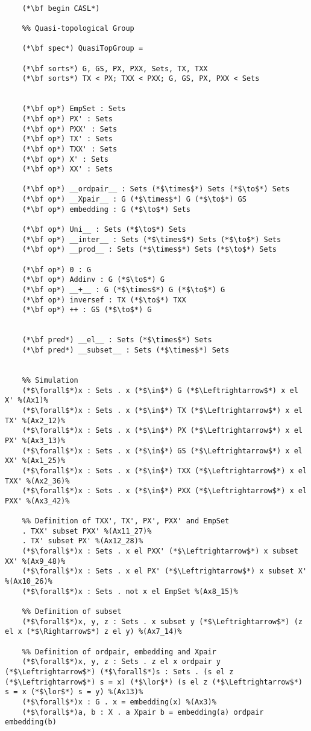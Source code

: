 \documentclass[preview]{standalone}
\begin{document}
\begin{lstlisting}

	(*\bf begin CASL*)
	
	%% Quasi-topological Group
	
	(*\bf spec*) QuasiTopGroup =
	
	(*\bf sorts*) G, GS, PX, PXX, Sets, TX, TXX
	(*\bf sorts*) TX < PX; TXX < PXX; G, GS, PX, PXX < Sets
	
	
	(*\bf op*) EmpSet : Sets
	(*\bf op*) PX' : Sets
	(*\bf op*) PXX' : Sets
	(*\bf op*) TX' : Sets
	(*\bf op*) TXX' : Sets
	(*\bf op*) X' : Sets
	(*\bf op*) XX' : Sets
	
	(*\bf op*) __ordpair__ : Sets (*$\times$*) Sets (*$\to$*) Sets
	(*\bf op*) __Xpair__ : G (*$\times$*) G (*$\to$*) GS
	(*\bf op*) embedding : G (*$\to$*) Sets
	
	(*\bf op*) Uni__ : Sets (*$\to$*) Sets
	(*\bf op*) __inter__ : Sets (*$\times$*) Sets (*$\to$*) Sets
	(*\bf op*) __prod__ : Sets (*$\times$*) Sets (*$\to$*) Sets
	
	(*\bf op*) 0 : G
	(*\bf op*) Addinv : G (*$\to$*) G
	(*\bf op*) __+__ : G (*$\times$*) G (*$\to$*) G
	(*\bf op*) inversef : TX (*$\to$*) TXX
	(*\bf op*) ++ : GS (*$\to$*) G
	
	
	(*\bf pred*) __el__ : Sets (*$\times$*) Sets
	(*\bf pred*) __subset__ : Sets (*$\times$*) Sets
	
	
	%% Simulation
	(*$\forall$*)x : Sets . x (*$\in$*) G (*$\Leftrightarrow$*) x el X' %(Ax1)%
	(*$\forall$*)x : Sets . x (*$\in$*) TX (*$\Leftrightarrow$*) x el TX' %(Ax2_12)%
	(*$\forall$*)x : Sets . x (*$\in$*) PX (*$\Leftrightarrow$*) x el PX' %(Ax3_13)%
	(*$\forall$*)x : Sets . x (*$\in$*) GS (*$\Leftrightarrow$*) x el XX' %(Ax1_25)%
	(*$\forall$*)x : Sets . x (*$\in$*) TXX (*$\Leftrightarrow$*) x el TXX' %(Ax2_36)%
	(*$\forall$*)x : Sets . x (*$\in$*) PXX (*$\Leftrightarrow$*) x el PXX' %(Ax3_42)%
	
	%% Definition of TXX', TX', PX', PXX' and EmpSet
	. TXX' subset PXX' %(Ax11_27)%
	. TX' subset PX' %(Ax12_28)%
	(*$\forall$*)x : Sets . x el PXX' (*$\Leftrightarrow$*) x subset XX' %(Ax9_48)%
	(*$\forall$*)x : Sets . x el PX' (*$\Leftrightarrow$*) x subset X' %(Ax10_26)%
	(*$\forall$*)x : Sets . not x el EmpSet %(Ax8_15)%
	
	%% Definition of subset
	(*$\forall$*)x, y, z : Sets . x subset y (*$\Leftrightarrow$*) (z el x (*$\Rightarrow$*) z el y) %(Ax7_14)%
	
	%% Definition of ordpair, embedding and Xpair
	(*$\forall$*)x, y, z : Sets . z el x ordpair y (*$\Leftrightarrow$*) (*$\forall$*)s : Sets . (s el z (*$\Leftrightarrow$*) s = x) (*$\lor$*) (s el z (*$\Leftrightarrow$*) s = x (*$\lor$*) s = y) %(Ax13)%
	(*$\forall$*)x : G . x = embedding(x) %(Ax3)%
	(*$\forall$*)a, b : X . a Xpair b = embedding(a) ordpair embedding(b)
	

\end{lstlisting}
\end{document}
